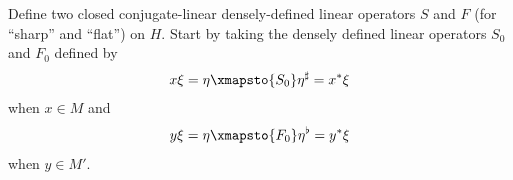 \documentclass[10pt]{mypackage}
\begin{document}
Define two closed conjugate-linear densely-defined linear operators $S$ and $F$ (for ``sharp'' and ``flat'') on $H$. Start by taking the densely defined linear operators $S_0$ and $F_0$ defined by
\begin{align*}
  x\xi = \eta \xmapsto{S_0} \eta^{\sharp} = x^{\ast}\xi
\end{align*}
when $x\in M$ and
\begin{align*}
  y\xi = \eta\xmapsto{F_0} \eta^{\flat} = y^{\ast}\xi
\end{align*}
when $y\in M'$.
\nocite{takesaki_1,takesaki_2,von_neumann_algebras_peterson,ii1_factors_houdayer,ii1_factors_anantharaman_popa,blackadar_operator_algebras,conway_functional_analysis,pedersen_analysis_now}
\printbibliography
\end{document}
